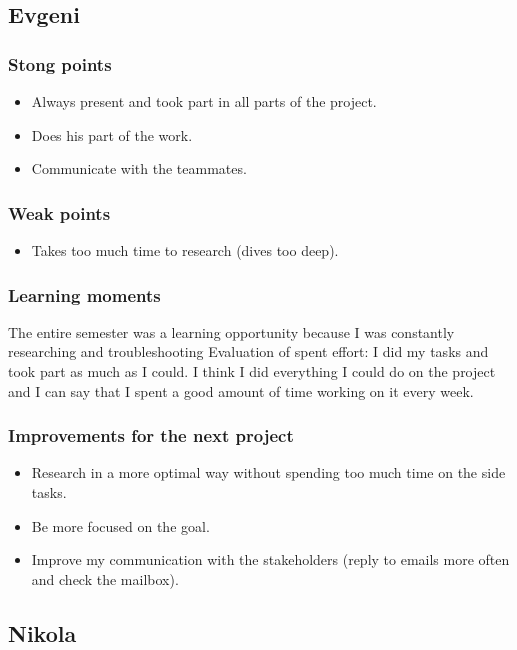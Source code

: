 \documentclass[10pt, a4paper]{article}
\begin{document}
\subsection{Evgeni}
\subsubsection{Stong points}
\begin{itemize}
	\item Always present and took part in all parts of the project.
	\item Does his part of the work.
	\item Communicate with the teammates.
\end{itemize}


\subsubsection{Weak points}
\begin{itemize}
	\item Takes too much time to research (dives too deep).
\end{itemize}

\subsubsection{Learning moments}

The entire semester was a learning opportunity because I was constantly researching and troubleshooting Evaluation of spent effort: I did my tasks and took part as much as I could. I think I did everything I could do on the project and I can say that I spent a good amount of time working on it every week.


\subsubsection{Improvements for the next project}
\begin{itemize}
    \item Research in a more optimal way without spending too much time on the side tasks.
    \item Be more focused on the goal.
    \item Improve my communication with the stakeholders (reply to emails more often and check the mailbox).
\end{itemize}


\subsection{Nikola}
\end{document}
